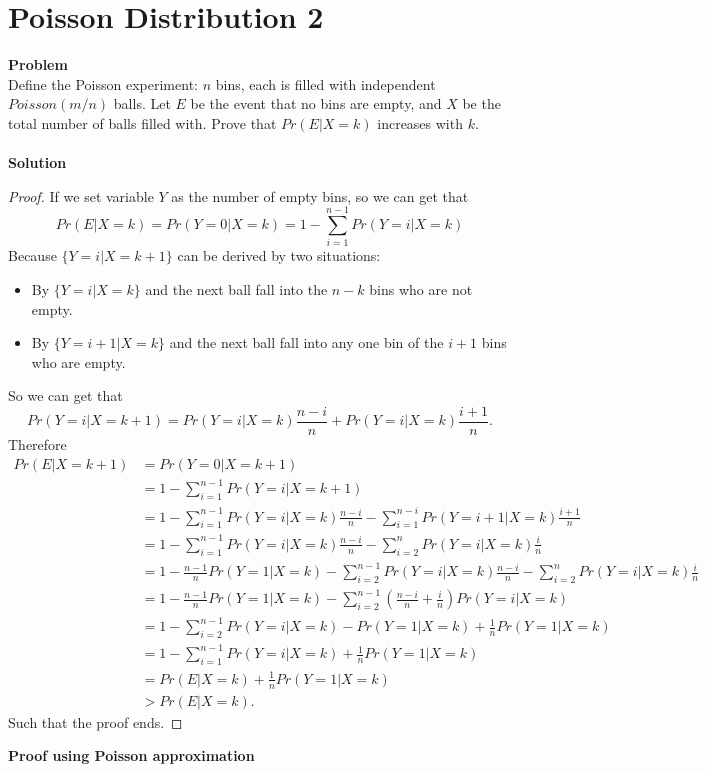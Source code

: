 	\section{Poisson Distribution 2}
	\textbf{Problem}\\
	Deﬁne the Poisson experiment: $n$ bins, each is filled with independent $Poisson(m/n)$ balls. Let $E$ be the event that no bins are empty, and $X$ be the total number of balls filled with. Prove that $Pr(E|X = k)$ increases with $k$.\\\\
	\textbf{Solution}\\
	\begin{proof}
		If we set variable $Y$ as the number of empty bins, so we can get that
		\[
		Pr(E|X = k) = Pr(Y = 0|X = k) = 1 - \sum_{i = 1}^{n - 1}Pr(Y = i | X = k)
		\]
		Because $\{Y = i | X = k + 1\}$ can be derived by two situations:
		\begin{itemize}
			\item By $\{Y = i | X = k\}$ and the next ball fall into the $n - k$ bins who are not empty.
			\item By $\{Y = i + 1|X= k\}$ and the next ball fall into any one bin of the $i + 1$ bins who are empty.
		\end{itemize}
		So we can get that
		\[
		Pr(Y = i|X = k+1) = Pr(Y=i|X = k)\frac{n - i}{n} + Pr(Y = i| X = k)\frac{i + 1}{n}.
		\]
		Therefore
		\begin{equation*}
			\begin{split}
				Pr(E | X = k + 1)
				&= Pr(Y = 0 | X = k　+ 1)\\
				&= 1 - \sum_{i = 1}^{n - 1}Pr(Y = i | X = k + 1)\\
				&= 1 - \sum_{i = 1}^{n - 1}Pr(Y = i|X = k)\frac{n - i}{n} - \sum_{i = 1}^{n - i}Pr(Y = i + 1|X = k)\frac{i + 1}{n}\\
				&= 1 - \sum_{i = 1}^{n - 1}Pr(Y = i | X = k)\frac{n - i}{n} - \sum_{i = 2}^{n}Pr(Y = i | X = k)\frac{i}{n}\\
				&=1 - \frac{n - 1}{n}Pr(Y = 1 | X = k) - \sum_{i = 2}^{n - 1}Pr(Y = i|X = k)\frac{n - i}{n} - \sum_{i = 2}^{n}Pr(Y = i|X = k)\frac{i}{n}\\
				&=1 - \frac{n - 1}{n}Pr(Y = 1|X = k) - \sum_{i = 2}^{n - 1}\left(\frac{n - i}{n}+\frac{i}{n}\right)Pr(Y = i| X = k)\\
				&=1 - \sum_{i = 2}^{n - 1}Pr(Y = i|X = k) - Pr(Y = 1|X = k) + \frac{1}{n}Pr(Y = 1|X = k)\\
				&= 1 - \sum_{i = 1}^{n - 1}Pr(Y = i | X = k) + \frac{1}{n}Pr(Y = 1|X = k)\\
				&= Pr(E|X = k) + \frac{1}{n}Pr(Y = 1 | X = k)\\
				&> Pr(E|X = k).
			\end{split}
		\end{equation*}
		Such that the proof ends.
	\end{proof}
	\textbf{Proof using Poisson approximation}
	
